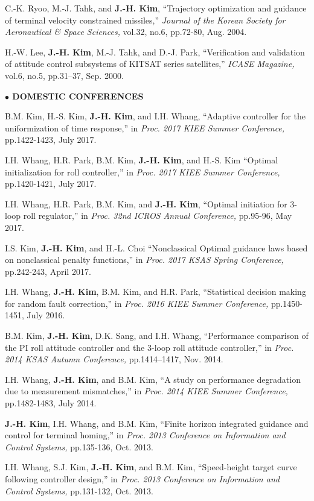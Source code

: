 \documentclass[margin,line]{res}
\begin{document}
\begin{resume}
C.-K. Ryoo, M.-J. Tahk, and {\bf J.-H. Kim}, ``Trajectory optimization and guidance of terminal velocity constrained missiles,'' \emph{Journal of the Korean Society for Aeronautical \& Space Sciences,} vol.32, no.6, pp.72-80, Aug. 2004.

H.-W. Lee, {\bf J.-H. Kim}, M.-J. Tahk, and D.-J. Park, ``Verification and validation of attitude control subsystems of KITSAT series satellites,'' \emph{ICASE Magazine,} vol.6, no.5, pp.31--37, Sep. 2000.

{\bf $\bullet$ DOMESTIC CONFERENCES}

B.M. Kim, H.-S. Kim, {\bf J.-H. Kim}, and I.H. Whang, ``Adaptive controller for the uniformization of time response,'' in \emph{Proc. 2017 KIEE Summer Conference,} pp.1422-1423, July 2017.

I.H. Whang, H.R. Park, B.M. Kim, {\bf J.-H. Kim}, and H.-S. Kim ``Optimal initialization for roll controller,'' in \emph{Proc. 2017 KIEE Summer Conference,} pp.1420-1421, July 2017.

I.H. Whang, H.R. Park, B.M. Kim, and {\bf J.-H. Kim}, ``Optimal initiation for 3-loop roll regulator,'' in \emph{Proc. 32nd ICROS Annual Conference,} pp.95-96, May 2017.

I.S. Kim, {\bf J.-H. Kim}, and H.-L. Choi ``Nonclassical Optimal guidance laws based on nonclassical penalty functions,'' in \emph{Proc. 2017 KSAS Spring Conference,} pp.242-243, April 2017.

I.H. Whang, {\bf J.-H. Kim}, B.M. Kim, and H.R. Park, ``Statistical decision making for random fault correction,'' in \emph{Proc. 2016 KIEE Summer Conference,} pp.1450-1451, July 2016.

B.M. Kim, {\bf J.-H. Kim}, D.K. Sang, and I.H. Whang, ``Performance comparison of the PI roll attitude controller and the 3-loop roll attitude controller,'' in \emph{Proc. 2014 KSAS Autumn Conference,} pp.1414--1417, Nov. 2014.

I.H. Whang, {\bf J.-H. Kim}, and B.M. Kim, ``A study on performance degradation due to measurement mismatches,'' in \emph{Proc. 2014 KIEE Summer Conference,} pp.1482-1483, July 2014.

{\bf J.-H. Kim}, I.H. Whang, and B.M. Kim, ``Finite horizon integrated guidance and control for terminal homing,'' in \emph{Proc. 2013 Conference on Information and Control Systems,} pp.135-136, Oct. 2013.

I.H. Whang, S.J. Kim, {\bf J.-H. Kim}, and B.M. Kim, ``Speed-height target curve following controller design,'' in \emph{Proc. 2013 Conference on Information and Control Systems,} pp.131-132, Oct. 2013.


\end{resume}
\end{document}
